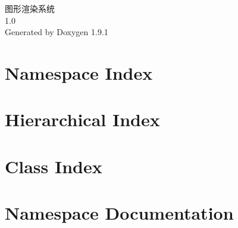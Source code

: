 \let\mypdfximage\pdfximage\def\pdfximage{\immediate\mypdfximage}\documentclass[twoside]{book}
\newcommand{\+}{\discretionary{\mbox{\scriptsize$\hookleftarrow$}}{}{}}
\newcommand{\clearemptydoublepage}{%
  \newpage{\pagestyle{empty}\cleardoublepage}%
}
\begin{document}
\raggedbottom

\hypersetup{pageanchor=false,
             bookmarksnumbered=true,
             pdfencoding=unicode
            }
\begin{titlepage}
\vspace*{7cm}
\begin{center}%
{\Large 图形渲染系统 \\[1ex]\large 1.\+0 }\\
\vspace*{1cm}
{\large Generated by Doxygen 1.9.1}\\
\end{center}
\end{titlepage}
\clearemptydoublepage
{}
\tableofcontents
\clearemptydoublepage
{}
\hypersetup{pageanchor=true}

\chapter{Namespace Index}

\chapter{Hierarchical Index}

\chapter{Class Index}

\chapter{Namespace Documentation}








\end{document}
